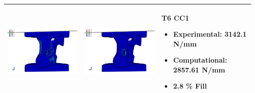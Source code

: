 \documentclass[11pt,a4paper]{article}
\begin{document}
\begin{landscape}
\begin{longtable}{|m{11cm}|m{11cm}|m{4cm}|}
\includegraphics[width=10cm]{images/T6_CC1_postVP_Interface_ABAQUS_All_Side_Stress.png}   & \includegraphics[width=10cm]{images/T6_CC1_postVP_Interface_ABAQUS_All_Side_Strain.png}   & T6 CC1  \begin{itemize} \item Experimental: 	3142.1	N/mm \item Computational:	2857.61 N/mm \item 2.8 \% Fill \end{itemize} \\ \hline 

\end{longtable}
\end{landscape}
\end{document}
